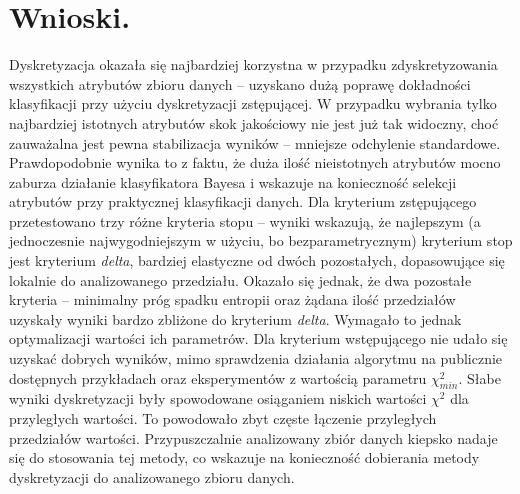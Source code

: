 \newpage
\section{Wnioski.}
Dyskretyzacja okazała się najbardziej korzystna w przypadku zdyskretyzowania wszystkich atrybutów zbioru danych -- uzyskano dużą poprawę dokładności klasyfikacji przy użyciu dyskretyzacji zstępującej. W przypadku wybrania tylko najbardziej istotnych atrybutów skok jakościowy nie jest już tak widoczny, choć zauważalna jest pewna stabilizacja wyników -- mniejsze odchylenie standardowe. Prawdopodobnie wynika to z faktu, że duża ilość nieistotnych atrybutów mocno zaburza działanie klasyfikatora Bayesa i wskazuje na konieczność selekcji atrybutów przy praktycznej klasyfikacji danych. Dla kryterium zstępującego przetestowano trzy różne kryteria stopu -- wyniki wskazują, że najlepszym (a jednoczesnie najwygodniejszym w użyciu, bo bezparametrycznym) kryterium stop jest kryterium \emph{delta}, bardziej elastyczne od dwóch pozostałych, dopasowujące się lokalnie do analizowanego przedziału. Okazało się jednak, że dwa pozostałe kryteria -- minimalny próg spadku entropii oraz żądana ilość przedziałów uzyskały wyniki bardzo zbliżone do kryterium \emph{delta}. Wymagało to jednak optymalizacji wartości ich parametrów. Dla kryterium wstępującego nie udało się uzyskać dobrych wyników, mimo sprawdzenia działania algorytmu na publicznie dostępnych przykładach oraz eksperymentów z wartością parametru $\chi^{2}_{min}$. Słabe wyniki dyskretyzacji były spowodowane osiąganiem niskich wartości $\chi^2$ dla przyległych wartości. To powodowało zbyt częste łączenie przyległych przedziałów wartości. Przypuszczalnie analizowany zbiór danych kiepsko nadaje się do stosowania tej metody, co wskazuje na konieczność dobierania metody dyskretyzacji do analizowanego zbioru danych. 
